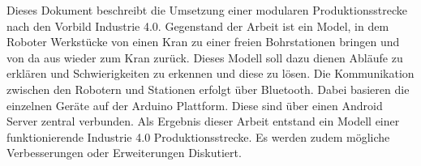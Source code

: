 

Dieses Dokument beschreibt die Umsetzung einer modularen Produktionsstrecke nach den Vorbild Industrie 4.0.
Gegenstand der Arbeit ist ein Model, in dem Roboter Werkstücke
von einen Kran zu einer freien Bohrstationen bringen und von da aus wieder zum Kran zurück. Dieses Modell soll dazu dienen Abläufe zu erklären und Schwierigkeiten zu erkennen und diese zu lösen.
Die Kommunikation zwischen den Robotern und Stationen erfolgt über Bluetooth. Dabei basieren die einzelnen Geräte auf der Arduino Plattform. Diese sind über einen Android Server zentral verbunden.
Als Ergebnis dieser Arbeit entstand ein Modell einer funktionierende Industrie 4.0 Produktionsstrecke. Es werden zudem mögliche Verbesserungen oder Erweiterungen Diskutiert.

